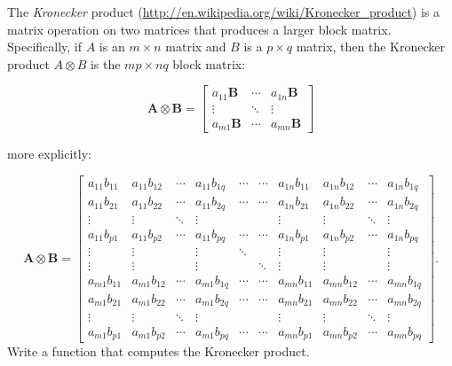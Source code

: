\begin{exer}
The \emph{Kronecker} product (\url{http://en.wikipedia.org/wiki/Kronecker_product}) is a matrix operation on two matrices
that produces a larger block matrix.  Specifically, if $A$ is an 
$m \times n$ matrix and $B$ is a $p \times q$ matrix, then the
Kronecker product $A \otimes B$ is the $mp \times nq$ block matrix:

$$\mathbf{A}\otimes\mathbf{B} = \begin{bmatrix} a_{11} \mathbf{B} & \cdots & a_{1n}\mathbf{B} \\ \vdots & \ddots & \vdots \\ a_{m1} \mathbf{B} & \cdots & a_{mn} \mathbf{B} \end{bmatrix}$$

more explicitly:

$${\mathbf{A}\otimes\mathbf{B}} = \begin{bmatrix}
   a_{11} b_{11} & a_{11} b_{12} & \cdots & a_{11} b_{1q} &
                   \cdots & \cdots & a_{1n} b_{11} & a_{1n} b_{12} & \cdots & a_{1n} b_{1q} \\
   a_{11} b_{21} & a_{11} b_{22} & \cdots & a_{11} b_{2q} &
                   \cdots & \cdots & a_{1n} b_{21} & a_{1n} b_{22} & \cdots & a_{1n} b_{2q} \\
   \vdots & \vdots & \ddots & \vdots & & & \vdots & \vdots & \ddots & \vdots \\
   a_{11} b_{p1} & a_{11} b_{p2} & \cdots & a_{11} b_{pq} &
                   \cdots & \cdots & a_{1n} b_{p1} & a_{1n} b_{p2} & \cdots & a_{1n} b_{pq} \\
   \vdots & \vdots & & \vdots & \ddots & & \vdots & \vdots & & \vdots \\
   \vdots & \vdots & & \vdots & & \ddots & \vdots & \vdots & & \vdots \\
   a_{m1} b_{11} & a_{m1} b_{12} & \cdots & a_{m1} b_{1q} &
                   \cdots & \cdots & a_{mn} b_{11} & a_{mn} b_{12} & \cdots & a_{mn} b_{1q} \\
   a_{m1} b_{21} & a_{m1} b_{22} & \cdots & a_{m1} b_{2q} &
                   \cdots & \cdots & a_{mn} b_{21} & a_{mn} b_{22} & \cdots & a_{mn} b_{2q} \\
   \vdots & \vdots & \ddots & \vdots & & & \vdots & \vdots & \ddots & \vdots \\
   a_{m1} b_{p1} & a_{m1} b_{p2} & \cdots & a_{m1} b_{pq} &
                   \cdots & \cdots & a_{mn} b_{p1} & a_{mn} b_{p2} & \cdots & a_{mn} b_{pq}
\end{bmatrix}. $$
Write a function that computes the Kronecker product.
\end{exer}

